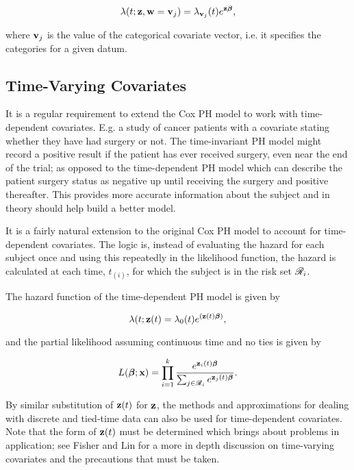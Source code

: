 \begin{equation}
    \lambda(t;\textbf{z},\textbf{w}=\textbf{v}_j) = \lambda_{\textbf{v}_j}(t)e^{\textbf{z}\boldsymbol{\beta}},
\end{equation}

where $\textbf{v}_j$ is the value of the categorical covariate vector, i.e. it specifies the categories for a given datum.

\subsection{Time-Varying Covariates}

It is a regular requirement to extend the Cox PH model to work with time-dependent covariates. E.g. a study of cancer patients with a covariate stating whether they have had surgery or not. The time-invariant PH model might record a positive result if the patient has ever received surgery, even near the end of the trial; as opposed to the time-dependent PH model which can describe the patient surgery status as negative up until receiving the surgery and positive thereafter. This provides more accurate information about the subject and in theory should help build a better model.

It is a fairly natural extension to the original Cox PH model to account for time-dependent covariates. The logic is, instead of evaluating the hazard for each subject once and using this repeatedly in the likelihood function, the hazard is calculated at each time, $t_{(i)}$, for which the subject is in the risk set $\mathscr{R}_i$.

The hazard function of the time-dependent PH model is given by

\begin{equation}
    \lambda(t;\textbf{z}(t)=\lambda_0(t)e^{(\textbf{z}(t)\boldsymbol{\beta})},
\end{equation}

and the partial likelihood assuming continuous time and no ties is given by

\begin{equation}
    L(\boldsymbol{\beta};\textbf{x}) = \prod_{i=1}^k\frac{e^{\textbf{z}_i(t)\boldsymbol{\beta}}}{\sum_{j\in\mathscr{R}_i}e^{\textbf{z}_j(t)\boldsymbol{\beta}}}.
\end{equation}

By similar substitution of $\textbf{z}(t)$ for $\textbf{z}$, the methods and approximations for dealing with discrete and tied-time data can also be used for time-dependent covariates. Note that the form of $\textbf{z}(t)$ must be determined which brings about problems in application; see Fisher and Lin  for a more in depth discussion on time-varying covariates and the precautions that must be taken.

